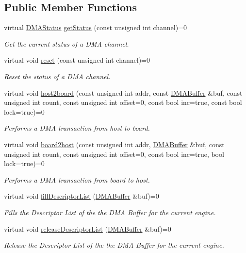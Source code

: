 \subsection*{Public Member Functions}
\begin{CompactItemize}
\item 
virtual \hyperlink{classmprace_1_1DMAEngine_w3}{DMAStatus} \hyperlink{classmprace_1_1DMAEngine_a1}{get\-Status} (const unsigned int channel)=0
\begin{CompactList}\small\item\em Get the current status of a DMA channel. \item\end{CompactList}\item 
virtual void \hyperlink{classmprace_1_1DMAEngine_a2}{reset} (const unsigned int channel)=0
\begin{CompactList}\small\item\em Reset the status of a DMA channel. \item\end{CompactList}\item 
virtual void \hyperlink{classmprace_1_1DMAEngine_a3}{host2board} (const unsigned int addr, const \hyperlink{classmprace_1_1DMABuffer}{DMABuffer} \&buf, const unsigned int count, const unsigned int offset=0, const bool inc=true, const bool lock=true)=0
\begin{CompactList}\small\item\em Performs a DMA transaction from host to board. \item\end{CompactList}\item 
virtual void \hyperlink{classmprace_1_1DMAEngine_a4}{board2host} (const unsigned int addr, \hyperlink{classmprace_1_1DMABuffer}{DMABuffer} \&buf, const unsigned int count, const unsigned int offset=0, const bool inc=true, bool lock=true)=0
\begin{CompactList}\small\item\em Performs a DMA transaction from board to host. \item\end{CompactList}\item 
virtual void \hyperlink{classmprace_1_1DMAEngine_a5}{fill\-Descriptor\-List} (\hyperlink{classmprace_1_1DMABuffer}{DMABuffer} \&buf)=0
\begin{CompactList}\small\item\em Fills the Descriptor List of the the DMA Buffer for the current engine. \item\end{CompactList}\item 
virtual void \hyperlink{classmprace_1_1DMAEngine_a6}{release\-Descriptor\-List} (\hyperlink{classmprace_1_1DMABuffer}{DMABuffer} \&buf)=0
\begin{CompactList}\small\item\em Release the Descriptor List of the the DMA Buffer for the current engine. \item\end{CompactList}\end{CompactItemize}
